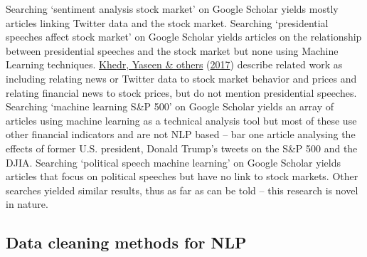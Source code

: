 \documentclass[11pt,preprint, authoryear]{elsarticle}
\numberwithin{equation}{section}
\numberwithin{figure}{section}
\numberwithin{table}{section}
\begin{document}
Searching `sentiment analysis stock market' on Google Scholar yields
mostly articles linking Twitter data and the stock market. Searching
`presidential speeches affect stock market' on Google Scholar yields
articles on the relationship between presidential speeches and the stock
market but none using Machine Learning techniques.
\protect\hyperlink{ref-khedr2017predicting}{Khedr, Yaseen \& others}
(\protect\hyperlink{ref-khedr2017predicting}{2017}) describe related
work as including relating news or Twitter data to stock market behavior
and prices and relating financial news to stock prices, but do not
mention presidential speeches. Searching `machine learning S\&P 500' on
Google Scholar yields an array of articles using machine learning as a
technical analysis tool but most of these use other financial indicators
and are not NLP based -- bar one article analysing the effects of former
U.S. president, Donald Trump's tweets on the S\&P 500 and the DJIA.
Searching `political speech machine learning' on Google Scholar yields
articles that focus on political speeches but have no link to stock
markets. Other searches yielded similar results, thus as far as can be
told -- this research is novel in nature.

\hypertarget{data-cleaning-methods-for-nlp}{%
\subsection{\texorpdfstring{Data cleaning methods for NLP
\label{data cleaning}}{Data cleaning methods for NLP }}\label{data-cleaning-methods-for-nlp}}
\end{document}
